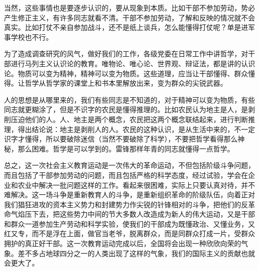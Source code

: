 当然，这些事情也是要逐步认识的，要从现象到本质。比如干部不参加劳动，势必产生修正主义，有许多同志就看不清。干部不参加劳动，了解和反映的情况就不会真实。比如打仗不亲自参加战斗，还不是纸上谈兵，怎么能懂得打仗呢？单是进军事学校也不行。

为了造成调查研究的风气，做好我们的工作，各级党委在日常工作中讲哲学，对干部进行马列主义认识论的教育。唯物论、唯心论、世界观、辩证法，都是讲的认识论。物质可以变为精神，精神可以变为物质。这些道理，应当让干部懂得、群众懂得。让哲学从哲学家的课堂上和书本里解放出来，变为群众的尖锐武器。

人的思想是从哪里来的，我们有些同志是不知道的，对于精神可以变为物质，有些同志就更糊涂了，但是不识字的农民是懂得推理的。比如农民认为地主是人，是剥削压迫他们的人。人、地主是两个概念，农民把这两个概念联结起来，进行判断推理，得出结论说：地主是剥削人的人。农民的这种认识，是从生活中来的，不一定识字才懂得，所以要破除迷信（当然不要破除了科学），不要把哲学看得那么神秘，那么困难。哲学是可以学到的。雷锋那样年青的同志就懂得一点哲学。

总之，这一次社会主义教育运动是一次伟大的革命运动，不但包括阶级斗争问题，而且包括了干部参加劳动的问题，而且包括严格的科学态度，经过试验，学会在企业和农业中解决一批问题这样的工作。看起来很困难，实际上只要认真对待，并不难解决。这一场斗争是重新教育人的斗争，是重新组织革命的阶级队伍，向着正对我们猖狂进攻的资本主义势力和封建势力作尖锐的针锋相对的斗争，把他们的反革命气焰压下去，把这些势力中间的节大多数人改造成为新人的伟大运动，又是干部和群众一道参加生产劳动和科学实验，使我们的干部成为既懂政治、又懂业务，又红又专，而不是浮在上面，做官当老爷，脱离群众，而是同群众打成一片，受群众拥护的真正好干部。这一次教育运动完成以后，全国将会出现一种欣欣向荣的气象。差不多占地球四分之一的人类出现了这样的气象，我们的国际主义的贡献也就会更大了。

